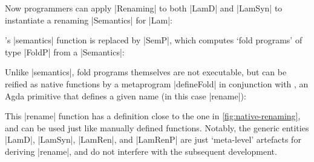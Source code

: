 \documentclass[sigplan,review,fleqn]{acmart}
\renewcommand{\verb}{\collectverb{\color{AgdaFunction}}}
\begin{document}

Now programmers can apply \verb|Renaming| to both \verb|LamD| and \verb|LamSyn| to instantiate a renaming \verb|Semantics| for \verb|Lam|:
\begin{code}
	\>[0]\AgdaSpace{}%
	\AgdaSymbol{=}\AgdaSpace{}%
	\AgdaSpace{}%
	\AgdaSpace{}%
	\<%
\end{code}
\citeauthor{Allais-generic-syntax}'s \verb|semantics| function is replaced by \verb|SemP|, which computes `fold programs' of type \verb|FoldP| from a \verb|Semantics|:
\begin{code}
	\>[0]\AgdaSpace{}%
	\AgdaSymbol{=}\AgdaSpace{}%
	\AgdaSpace{}%
	\AgdaSpace{}%
	\AgdaSpace{}%
	\<%
\end{code}
Unlike \verb|semantics|, fold programs themselves are not executable, but can be reified as native functions by a metaprogram \verb|defineFold| in conjunction with , an Agda primitive that defines a given name (in this case \verb|rename|):
\begin{code}
	\>[0]\AgdaSpace{}%
	\AgdaSpace{}%
	\AgdaSymbol{=}\AgdaSpace{}%
	\AgdaSpace{}%
	\AgdaSpace{}%
	\<%
\end{code}
This \verb|rename| function has a definition close to the one in \cref{fig:native-renaming}, and can be used just like manually defined functions.
Notably, the generic entities \verb|LamD|, \verb|LamSyn|, \verb|LamRen|, and \verb|LamRenP| are just `meta-level' artefacts for deriving \verb|rename|, and do not interfere with the subsequent development.


\end{document}
